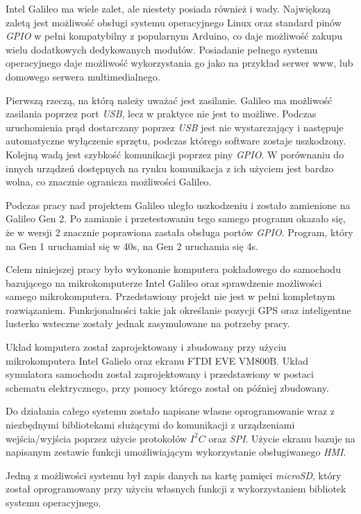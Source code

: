 \documentclass{xmgr}
\begin{document}
Intel Galileo ma wiele zalet, ale niestety posiada również i wady. Największą zaletą jest możliwość obsługi systemu operacyjnego Linux oraz standard pinów \emph{GPIO} w pełni kompatybilny z popularnym Arduino, co daje możliwość zakupu wielu dodatkowych dedykowanych modułów. Posiadanie pełnego systemu operacyjnego daje możliwość wykorzystania go jako na przykład serwer www, lub domowego serwera multimedialnego. 

Pierwszą rzeczą, na którą należy uważać jest zasilanie. Galileo ma możliwość zasilania poprzez port \emph{USB}, lecz w praktyce nie jest to możliwe. Podczas uruchomienia prąd dostarczany poprzez \emph{USB} jest nie wystarczający i następuje automatyczne wyłączenie sprzętu, podczas którego software zostaje uszkodzony. Kolejną wadą jest szybkość komunikacji poprzez piny \emph{GPIO}. W porównaniu do innych urządzeń dostępnych na rynku komunikacja z ich użyciem jest bardzo wolna, co znacznie ogranicza możliwości Galileo.

Podczas pracy nad projektem Galileo uległo uszkodzeniu i zostało zamienione na Galileo Gen 2. Po zamianie i przetestowaniu tego samego programu okazało się, że w wersji 2 znacznie poprawiona zastała obsługa portów \emph{GPIO}. Program, który na Gen 1 uruchamiał się w 40s, na Gen 2 uruchamia się 4s.

\summary
Celem niniejszej pracy było wykonanie komputera pokładowego do samochodu bazującego na mikrokomputerze Intel Galileo oraz sprawdzenie możliwości samego mikrokomputera. Przedstawiony projekt nie jest w pełni kompletnym rozwiązaniem. Funkcjonalności takie jak określanie pozycji GPS oraz inteligentne lusterko wsteczne zostały jednak zasymulowane na potrzeby pracy.

Układ komputera został zaprojektowany i zbudowany przy użyciu mikrokomputera Intel Galielo oraz ekranu FTDI EVE VM800B. Układ symulatora samochodu został zaprojektowany i przedstawiony w postaci schematu elektrycznego, przy pomocy którego został on później zbudowany. 

Do działania całego systemu zostało napisane własne oprogramowanie wraz z niezbędnymi bibliotekami służącymi do komunikacji z urządzeniami wejścia/wyjścia poprzez użycie protokołów $I^2C$ oraz \emph{SPI}. Użycie ekranu bazuje na napisanym zestawie funkcji umożliwiającym wykorzystanie obsługiwanego \emph{HMI}.

Jedną z możliwości systemu był zapis danych na kartę pamięci \emph{microSD}, który został oprogramowany przy użyciu własnych funkcji z wykorzystaniem bibliotek systemu operacyjnego. 
\end{document}

